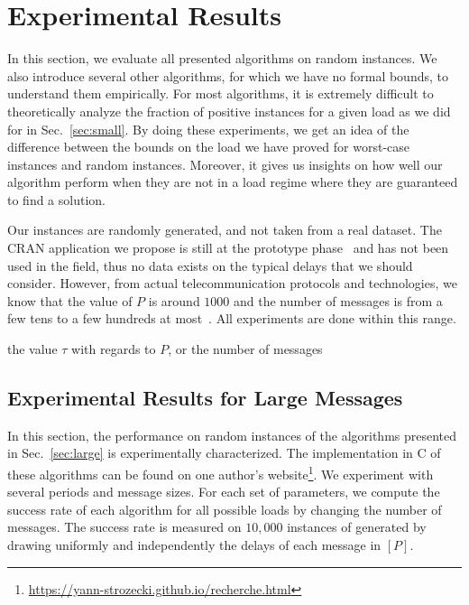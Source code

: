 \documentclass[pdflatex,sn-mathphys,iicol]{sn-jnl}%
\theoremstyle{thmstyleone}%
\theoremstyle{thmstyletwo}%
\theoremstyle{thmstylethree}%
\begin{document}
\section{Experimental Results}\label{sec:perf}

In this section, we evaluate all presented algorithms on random instances. We also introduce several other algorithms, for which we have no formal bounds, to understand them empirically. 
For most algorithms, it is extremely difficult to theoretically analyze the fraction of positive instances for a given load as we did for \greedyuniform in Sec.~\ref{sec:small}. By doing these experiments, we get an idea of the difference between the bounds on the load we have proved for worst-case instances and random instances. Moreover, it gives us insights on how well our algorithm perform when they are not in a load regime where they are guaranteed to find a solution.

Our instances are randomly generated, and not taken from a real dataset. The CRAN application we propose
is still at the prototype phase~\cite{DBLP:conf/ccnc/GuiraudLM22} and has not been used in the field, thus no data exists on the typical delays that we should consider. However, from actual telecommunication protocols and technologies, we know that the value of $P$ is around $1000$ and the number of messages is from a few tens to a few hundreds at most~\cite{bartharxiv2018deterministic}. All experiments are done within this range.


the value $\tau$ with regards to $P$, or the number of messages 


\subsection{Experimental Results for Large Messages} \label{sec:perf_large}


In this section, the performance on random instances of the algorithms presented in Sec.~\ref{sec:large} is experimentally characterized. The implementation in C of these algorithms can be found on one author's website\footnote{\url{https://yann-strozecki.github.io/recherche.html}}. We experiment with several periods and message sizes. For each set of parameters, we compute the success rate of each algorithm for all possible loads by changing the number of messages. The success rate is measured on $10,000$ instances of \pma generated by drawing uniformly and independently the delays of each message in $[P]$. 
\end{document}
